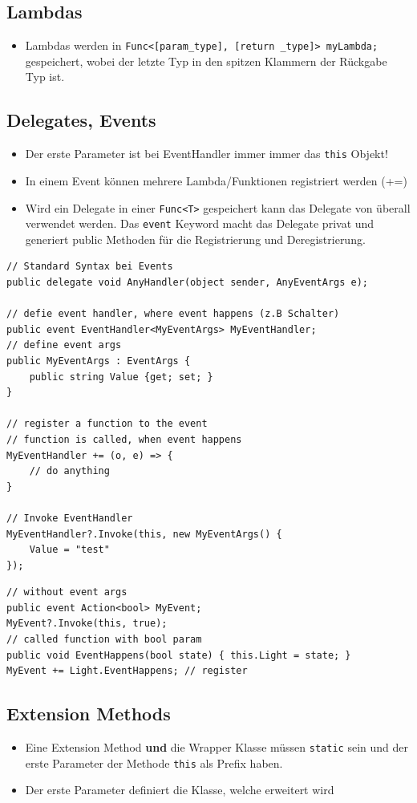 \documentclass[
a4paper,
oneside,
10pt,
fleqn,
headsepline,
toc=listofnumbered, 
bibliography=totocnumbered]{scrartcl}
\begin{document}
\clearpage

\subsection{Lambdas}
\begin{itemize}
	\item Lambdas werden in \lstinline|Func<[param_type], [return _type]> myLambda;| gespeichert, wobei der letzte Typ in den spitzen Klammern der Rückgabe Typ ist.
\end{itemize}

\subsection{Delegates, Events}
\begin{itemize}
	\item Der erste Parameter ist bei EventHandler immer immer das \lstinline|this| Objekt!
	\item In einem Event können mehrere Lambda/Funktionen registriert werden (+=)
	\item Wird ein Delegate in einer \lstinline|Func<T>| gespeichert kann das Delegate von überall verwendet werden. Das \lstinline|event| Keyword macht das Delegate privat und generiert public Methoden für die Registrierung und Deregistrierung.
\end{itemize}

\begin{lstlisting}
// Standard Syntax bei Events
public delegate void AnyHandler(object sender, AnyEventArgs e);

// defie event handler, where event happens (z.B Schalter)
public event EventHandler<MyEventArgs> MyEventHandler;
// define event args
public MyEventArgs : EventArgs {
	public string Value {get; set; }
}

// register a function to the event
// function is called, when event happens
MyEventHandler += (o, e) => {
	// do anything
}

// Invoke EventHandler
MyEventHandler?.Invoke(this, new MyEventArgs() {
	Value = "test"
});
\end{lstlisting}
\begin{lstlisting}
// without event args
public event Action<bool> MyEvent;
MyEvent?.Invoke(this, true);
// called function with bool param
public void EventHappens(bool state) { this.Light = state; }
MyEvent += Light.EventHappens; // register
\end{lstlisting}

\subsection{Extension Methods}
\begin{itemize}
	\item Eine Extension Method \textbf{und} die Wrapper Klasse müssen \lstinline|static| sein und der erste Parameter der Methode \lstinline|this| als Prefix haben. 
	\item Der erste Parameter definiert die Klasse, welche erweitert wird
\end{itemize}
\end{document}

